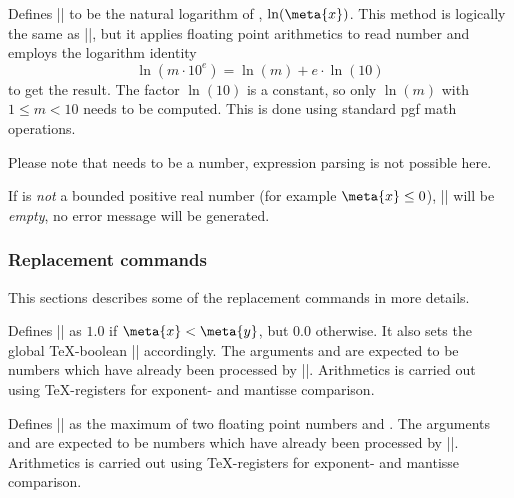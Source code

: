 \begin{command}{}
	Defines |\pgfmathresult| to be the natural logarithm of , $\ln(\meta{x})$. This method is logically the same as |\pgfmathln|, but it applies floating point arithmetics to read number  and employs the logarithm identity 
		\[ \ln(m \cdot 10^e) = \ln(m) + e \cdot \ln(10) \]
	to get the result. The factor $\ln(10)$ is a constant, so only $\ln(m)$ with $1 \le m < 10$ needs to be computed. This is done using standard pgf math operations.

	Please note that  needs to be a number, expression parsing is not possible here.

	If  is \emph{not} a bounded positive real number (for example $\meta{x} \le 0$), |\pgfmathresult| will be \emph{empty}, no error message will be generated.
\begin{codeexample}[]
\pgfmathresult
\end{codeexample}
\begin{codeexample}[]
\pgfmathresult
\end{codeexample}
\end{command}

\subsubsection{Replacement commands}
This sections describes some of the replacement commands in more details.
\begin{command}{}
	Defines |\pgfmathresult| as $1.0$ if $\meta{x} < \meta{y}$, but $0.0$ otherwise. It also sets the global \TeX-boolean |\pgfmathfloatcomparison| accordingly. The arguments  and  are expected to be numbers which have already been processed by |\pgfmathfloatparsenumber|. Arithmetics is carried out using \TeX-registers for exponent- and mantisse comparison.
\end{command}

\begin{command}{}
	Defines |\pgfmathresult| as the maximum of two floating point numbers  and . The arguments  and  are expected to be numbers which have already been processed by |\pgfmathfloatparsenumber|. Arithmetics is carried out using \TeX-registers for exponent- and mantisse comparison.
\end{command}

